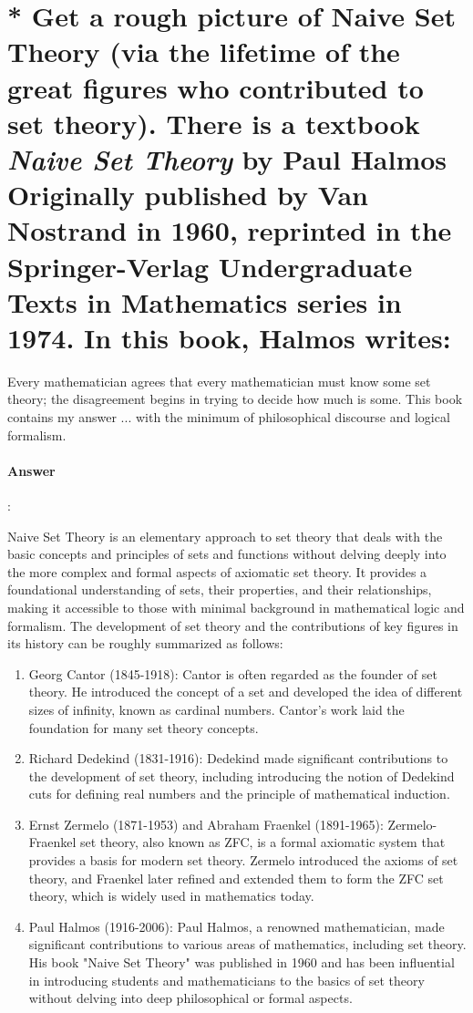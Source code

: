 \documentclass{article}
\begin{document}
\section{* Get a rough picture of Naive Set Theory (via the lifetime of the great figures who contributed to set theory). There is a textbook \textit{Naive Set Theory} by Paul Halmos Originally published by Van Nostrand in 1960, reprinted in the Springer-Verlag Undergraduate Texts in Mathematics series in 1974. In this book, Halmos writes:}

\begin{tcolorbox}
  Every mathematician agrees that every mathematician must know some set theory; the disagreement begins in trying to decide how much is some. This book contains my answer ... with the minimum of philosophical discourse and logical formalism.
\end{tcolorbox}

\paragraph{Answer}:

Naive Set Theory is an elementary approach to set theory that deals with the basic concepts and principles of sets and functions without delving deeply into the more complex and formal aspects of axiomatic set theory. It provides a foundational understanding of sets, their properties, and their relationships, making it accessible to those with minimal background in mathematical logic and formalism. The development of set theory and the contributions of key figures in its history can be roughly summarized as follows:

\begin{enumerate}
  \item Georg Cantor (1845-1918): Cantor is often regarded as the founder of set theory. He introduced the concept of a set and developed the idea of different sizes of infinity, known as cardinal numbers. Cantor's work laid the foundation for many set theory concepts.
  \item Richard Dedekind (1831-1916): Dedekind made significant contributions to the development of set theory, including introducing the notion of Dedekind cuts for defining real numbers and the principle of mathematical induction.
  \item Ernst Zermelo (1871-1953) and Abraham Fraenkel (1891-1965): Zermelo-Fraenkel set theory, also known as ZFC, is a formal axiomatic system that provides a basis for modern set theory. Zermelo introduced the axioms of set theory, and Fraenkel later refined and extended them to form the ZFC set theory, which is widely used in mathematics today.
  \item Paul Halmos (1916-2006): Paul Halmos, a renowned mathematician, made significant contributions to various areas of mathematics, including set theory. His book "Naive Set Theory" was published in 1960 and has been influential in introducing students and mathematicians to the basics of set theory without delving into deep philosophical or formal aspects.
\end{enumerate}
\end{document}
